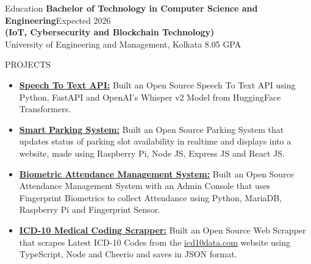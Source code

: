 \documentclass{resume}
\begin{document}
\vspace{-0.4em}
\begin{rSection}{Education}
  \textbf{Bachelor of Technology in Computer Science and Engineering}\hfill {Expected 2026}\\
  \textbf{(IoT, Cybersecurity and Blockchain Technology)}\\
  University of Engineering and Management, Kolkata \hfill  8.05 GPA
\end{rSection}
\vspace{-0.4em}
\begin{rSection}{PROJECTS}
  \begin{itemize}
    \item \textbf{\href{https://github.com/Arkapravo-Ghosh/speech-to-text}{Speech To Text API:}} {Built an Open Source Speech To Text API using Python, FastAPI and OpenAI's Whisper v2 Model from HuggingFace Transformers.}
    \item \textbf{\href{https://github.com/Arkapravo-Ghosh/Smart-Parking-System}{Smart Parking System:}} {Built an Open Source Parking System that updates status of parking slot availability in realtime and displays into a website, made using Raspberry Pi, Node JS, Express JS and React JS.}
    \item \textbf{\href{https://github.com/Arkapravo-Ghosh/attendance-monitoring-system}{Biometric Attendance Management System:}} {Built an Open Source Attendance Management System with an Admin Console that uses Fingerprint Biometrics to collect Attendance using Python, MariaDB, Raspberry Pi and Fingerprint Sensor.}
    \item \textbf{\href{https://github.com/Arkapravo-Ghosh/icd10-scrapper}{ICD-10 Medical Coding Scrapper:}} {Built an Open Source Web Scrapper that scrapes Latest ICD-10 Codes from the {\href{https://www.icd10data.com}{icd10data.com}} website using TypeScript, Node and Cheerio and saves in JSON format.}
  \end{itemize}
\end{rSection}
\vspace{-0.4em}
\end{document}
